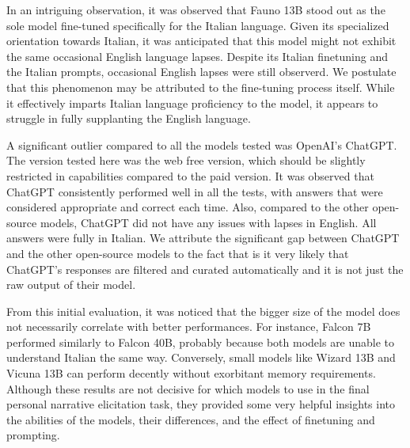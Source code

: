 In an intriguing observation, it was observed that Fauno 13B \cite{fauno} stood out as the sole model fine-tuned specifically for the Italian language. Given its specialized orientation towards Italian, it was anticipated that this model might not exhibit the same occasional English language lapses. Despite its Italian finetuning and the Italian prompts, occasional English lapses were still observerd. We postulate that this phenomenon may be attributed to the fine-tuning process itself. While it effectively imparts Italian language proficiency to the model, it appears to struggle in fully supplanting the English language.

A significant outlier compared to all the models tested was OpenAI's ChatGPT. The version tested here was the web free version, which should be slightly restricted in capabilities compared to the paid version. It was observed that ChatGPT consistently performed well in all the tests, with answers that were considered appropriate and correct each time. Also, compared to the other open-source models, ChatGPT did not have any issues with lapses in English. All answers were fully in Italian. We attribute the significant gap between ChatGPT and the other open-source models to the fact that is it very likely that ChatGPT's responses are filtered and curated automatically and it is not just the raw output of their model.

From this initial evaluation, it was noticed that the bigger size of the model does not necessarily correlate with better performances. For instance, Falcon 7B performed similarly to Falcon 40B, probably because both models are unable to understand Italian the same way. Conversely, small models like Wizard 13B and Vicuna 13B can perform decently without exorbitant memory requirements. Although these results are not decisive for which models to use in the final personal narrative elicitation task, they provided some very helpful insights into the abilities of the models, their differences, and the effect of finetuning and prompting.
